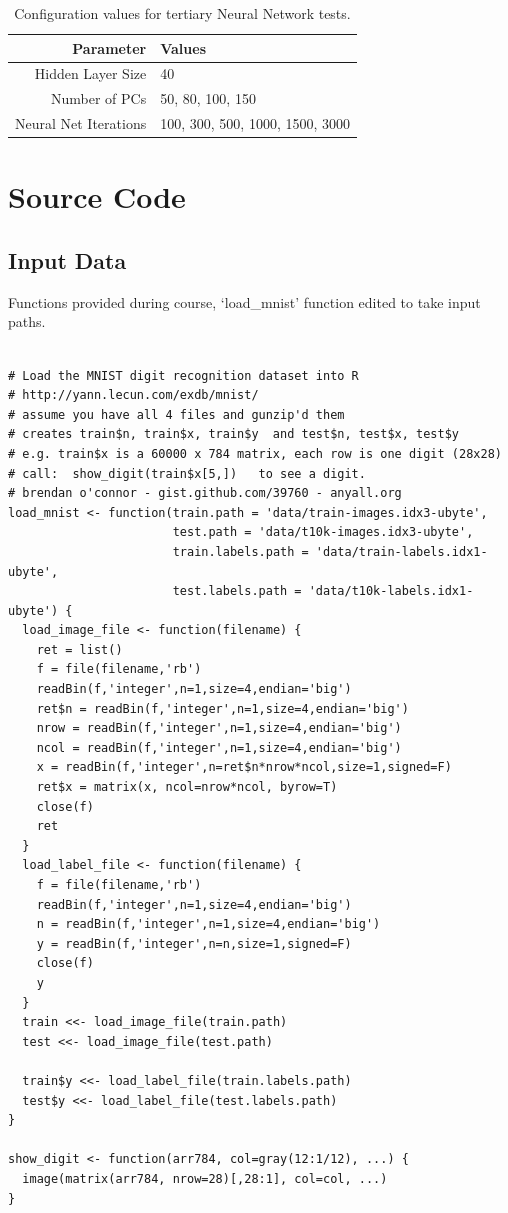 \documentclass[11pt]{article} %
\begin{document}
\begin{table}[h!]
\begin{center}
\begin{tabular}{rl}
Parameter & Values \\
\hline
Hidden Layer Size & 40\\
Number of PCs & 50, 80, 100, 150\\
Neural Net Iterations & 100, 300, 500, 1000, 1500, 3000\\
\hline
\end{tabular}
\caption{Configuration values for tertiary Neural Network tests.}
\label{nnet_parameters_third}
\end{center}
\end{table}


\section{Source Code}

\subsection{Input Data}

Functions provided during course, `load\_mnist' function edited to take input paths. 
\begin{lstlisting}

# Load the MNIST digit recognition dataset into R
# http://yann.lecun.com/exdb/mnist/
# assume you have all 4 files and gunzip'd them
# creates train$n, train$x, train$y  and test$n, test$x, test$y
# e.g. train$x is a 60000 x 784 matrix, each row is one digit (28x28)
# call:  show_digit(train$x[5,])   to see a digit.
# brendan o'connor - gist.github.com/39760 - anyall.org
load_mnist <- function(train.path = 'data/train-images.idx3-ubyte',
                       test.path = 'data/t10k-images.idx3-ubyte',
                       train.labels.path = 'data/train-labels.idx1-ubyte',
                       test.labels.path = 'data/t10k-labels.idx1-ubyte') {
  load_image_file <- function(filename) {
    ret = list()
    f = file(filename,'rb')
    readBin(f,'integer',n=1,size=4,endian='big')
    ret$n = readBin(f,'integer',n=1,size=4,endian='big')
    nrow = readBin(f,'integer',n=1,size=4,endian='big')
    ncol = readBin(f,'integer',n=1,size=4,endian='big')
    x = readBin(f,'integer',n=ret$n*nrow*ncol,size=1,signed=F)
    ret$x = matrix(x, ncol=nrow*ncol, byrow=T)
    close(f)
    ret
  }
  load_label_file <- function(filename) {
    f = file(filename,'rb')
    readBin(f,'integer',n=1,size=4,endian='big')
    n = readBin(f,'integer',n=1,size=4,endian='big')
    y = readBin(f,'integer',n=n,size=1,signed=F)
    close(f)
    y
  }
  train <<- load_image_file(train.path)
  test <<- load_image_file(test.path)
  
  train$y <<- load_label_file(train.labels.path)
  test$y <<- load_label_file(test.labels.path)  
}

show_digit <- function(arr784, col=gray(12:1/12), ...) {
  image(matrix(arr784, nrow=28)[,28:1], col=col, ...)
}

\end{lstlisting}
\end{document}
